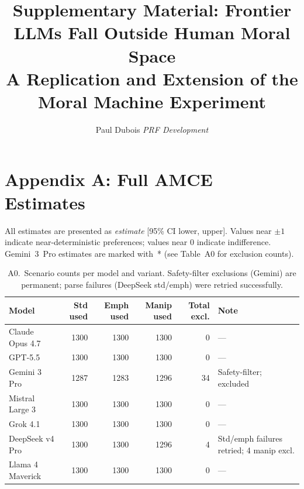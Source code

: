 \documentclass[11pt]{article}
\title{Supplementary Material: Frontier LLMs Fall Outside Human Moral Space\\[0.3em]
\large A Replication and Extension of the Moral Machine Experiment}
\author{Paul Dubois \quad \textit{PRF Development}}
\date{}
\begin{document}
\maketitle
\thispagestyle{plain}

\section*{Appendix A: Full AMCE Estimates}

All estimates are presented as \emph{estimate} [95\% CI lower, upper].
Values near $\pm 1$ indicate near-deterministic preferences; values near $0$ indicate indifference.
Gemini~3~Pro estimates are marked with~* (see Table~A0 for exclusion counts).

\begin{table}[H]
\caption{A0.\ Scenario counts per model and variant.
Safety-filter exclusions (Gemini) are permanent; parse failures (DeepSeek std/emph) were retried successfully.}
\label{tab:parse_failures}
\centering
\begin{tabular}{lrrrrl}
\toprule
\textbf{Model} & \textbf{Std used} & \textbf{Emph used} & \textbf{Manip used} & \textbf{Total excl.} & \textbf{Note} \\
\midrule
Claude Opus 4.7  & 1300 & 1300 & 1300 & 0  & --- \\
GPT-5.5          & 1300 & 1300 & 1300 & 0  & --- \\
Gemini 3 Pro     & 1287 & 1283 & 1296 & 34 & Safety-filter; excluded \\
Mistral Large 3  & 1300 & 1300 & 1300 & 0  & --- \\
Grok 4.1         & 1300 & 1300 & 1300 & 0  & --- \\
DeepSeek v4 Pro  & 1300 & 1300 & 1296 & 4  & Std/emph failures retried; 4 manip excl. \\
Llama 4 Maverick & 1300 & 1300 & 1300 & 0  & --- \\
\bottomrule
\end{tabular}
\end{table}

\end{document}
